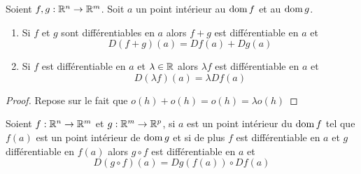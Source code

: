 \begin{proposition}
    Soient $f,g:\mathbb{R}^n\to \mathbb{R}^m$. Soit $a$ un point intérieur au $\operatorname{dom} f$ et au $\operatorname{dom} g$.
    \begin{enumerate}
        \item Si $f$ et $g$ sont différentiables en $a$ alors $f+g$ est différentiable en $a$ et 
        \begin{equation*}
            D(f+g)(a)=Df(a)+Dg(a)
        \end{equation*}
        \item Si $f$ est différentiable en $a$ et $\lambda\in\mathbb{R}$ alors $\lambda f$ est différentiable en $a$ et $$D(\lambda f)(a) = \lambda Df(a)$$
    \end{enumerate}
\end{proposition}
\begin{proof}
    Repose sur le fait que $o(h)+o(h)=o(h)=\lambda o(h)$
\end{proof}
\begin{theoreme}
    Soient $f:\mathbb{R}^n\to \mathbb{R}^m$ et $g:\mathbb{R}^m\to \mathbb{R}^p$, si $a$ est un point intérieur du $\operatorname{dom} f$ tel que $f(a)$ est un point intérieur de $\operatorname{dom} g$ et si de plus $f$ est différentiable en $a$ et $g$ différentiable en $f(a)$ alors $g\circ f$ est différentiable en $a$ et
    \begin{equation*}
        D(g\circ f)(a)= Dg(f(a)) \circ Df(a)
    \end{equation*}
\end{theoreme}

